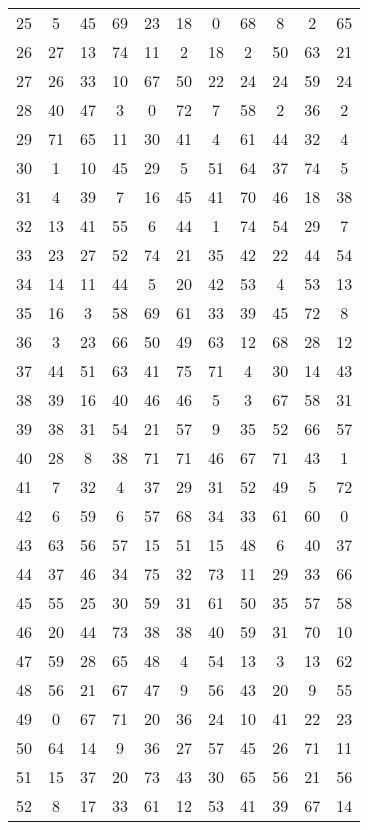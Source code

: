 \begin{table}
\begin{tabular}{c c c c c c c c c c c }
25 & 5 & 45 & 69 & 23 & 18 & 0 & 68 & 8 & 2 & 65 \\
26 & 27 & 13 & 74 & 11 & 2 & 18 & 2 & 50 & 63 & 21 \\
27 & 26 & 33 & 10 & 67 & 50 & 22 & 24 & 24 & 59 & 24 \\
28 & 40 & 47 & 3 & 0 & 72 & 7 & 58 & 2 & 36 & 2 \\
29 & 71 & 65 & 11 & 30 & 41 & 4 & 61 & 44 & 32 & 4 \\
30 & 1 & 10 & 45 & 29 & 5 & 51 & 64 & 37 & 74 & 5 \\
31 & 4 & 39 & 7 & 16 & 45 & 41 & 70 & 46 & 18 & 38 \\
32 & 13 & 41 & 55 & 6 & 44 & 1 & 74 & 54 & 29 & 7 \\
33 & 23 & 27 & 52 & 74 & 21 & 35 & 42 & 22 & 44 & 54 \\
34 & 14 & 11 & 44 & 5 & 20 & 42 & 53 & 4 & 53 & 13 \\
35 & 16 & 3 & 58 & 69 & 61 & 33 & 39 & 45 & 72 & 8 \\
36 & 3 & 23 & 66 & 50 & 49 & 63 & 12 & 68 & 28 & 12 \\
37 & 44 & 51 & 63 & 41 & 75 & 71 & 4 & 30 & 14 & 43 \\
38 & 39 & 16 & 40 & 46 & 46 & 5 & 3 & 67 & 58 & 31 \\
39 & 38 & 31 & 54 & 21 & 57 & 9 & 35 & 52 & 66 & 57 \\
40 & 28 & 8 & 38 & 71 & 71 & 46 & 67 & 71 & 43 & 1 \\
41 & 7 & 32 & 4 & 37 & 29 & 31 & 52 & 49 & 5 & 72 \\
42 & 6 & 59 & 6 & 57 & 68 & 34 & 33 & 61 & 60 & 0 \\
43 & 63 & 56 & 57 & 15 & 51 & 15 & 48 & 6 & 40 & 37 \\
44 & 37 & 46 & 34 & 75 & 32 & 73 & 11 & 29 & 33 & 66 \\
45 & 55 & 25 & 30 & 59 & 31 & 61 & 50 & 35 & 57 & 58 \\
46 & 20 & 44 & 73 & 38 & 38 & 40 & 59 & 31 & 70 & 10 \\
47 & 59 & 28 & 65 & 48 & 4 & 54 & 13 & 3 & 13 & 62 \\
48 & 56 & 21 & 67 & 47 & 9 & 56 & 43 & 20 & 9 & 55 \\
49 & 0 & 67 & 71 & 20 & 36 & 24 & 10 & 41 & 22 & 23 \\
50 & 64 & 14 & 9 & 36 & 27 & 57 & 45 & 26 & 71 & 11 \\
51 & 15 & 37 & 20 & 73 & 43 & 30 & 65 & 56 & 21 & 56 \\
52 & 8 & 17 & 33 & 61 & 12 & 53 & 41 & 39 & 67 & 14 \\

\end{tabular}
\end{table}
